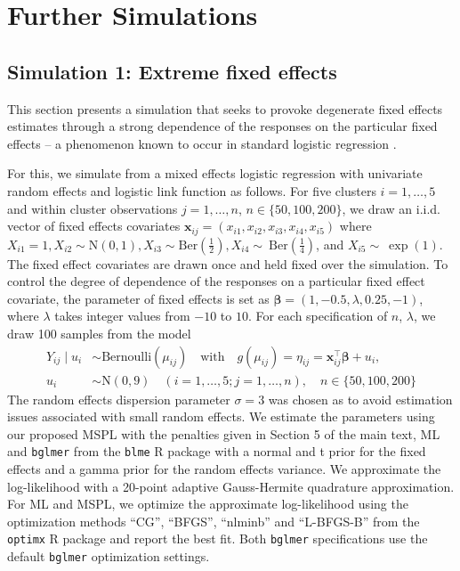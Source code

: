 \documentclass[11pt, a4paper]{article}
\newcommand*{\bb}{\boldsymbol}
\theoremstyle{example} \newtheorem{example}{Example}[section]
\theoremstyle{theorem} \newtheorem{theorem}{Theorem}[section]
\theoremstyle{theorem }\newtheorem{proposition}{Proposition}[section]
\theoremstyle{theorem }\newtheorem{corollary}{Corollary}[section]
\def\\bbeta{\bb{\\bbeta}}
\def\bx{\bb{x}}
\begin{document}
\section{Further Simulations} \label{sec:simuls}

\subsection{Simulation 1: Extreme fixed effects}\label{sec:sim1}

This section presents a simulation that seeks to provoke degenerate fixed effects estimates through a strong dependence of the responses on the particular fixed effects -- a phenomenon known to occur in standard logistic regression \citep{albert+anderson:1984,kosmidis+firth:2021}.

For this, we simulate from a mixed effects logistic regression with univariate random effects and logistic link function as follows. For five clusters $i=1,\ldots,5$ and within cluster observations $j=1,\ldots,n$, $n \in \{50,100,200\}$, we draw an i.i.d. vector of fixed effects covariates $\bx_{ij} = (x_{i1},x_{i2},x_{i3},x_{i4},x_{i5})$ where $X_{i1}=1, {X}_{i2} \sim \text{N}(0,1), {X}_{i3}\sim \textrm{Ber}\left(\frac{1}{2}\right), {X}_{i4}\sim~\textrm{Ber}\left(\frac{1}{4}\right)$, and ${X}_{i5}\sim~\exp(1)$. The fixed effect covariates are drawn once and held fixed over the simulation. To control the degree of dependence of the responses on a particular fixed effect covariate, the parameter of fixed effects is set as $\bb \beta=(1,-0.5,\lambda,0.25,-1)$, where $\lambda$ takes integer values from $-10$ to $10$. For each specification of $n$, $\lambda$, we draw 100 samples from the model 
\begin{equation}
	\begin{aligned}
		\label{eq:sim1_model} 
		Y_{ij} \mid {u}_i & \sim \text{Bernoulli}(\mu_{ij}) \quad \text{with} \quad
		g(\mu_{ij}) = \eta_{ij} = \bx_{ij}^\top \bb \beta + u_i,\\
		u_i & \sim \text{N}(0, 9)  \quad (i = 1, \ldots, 5; j = 1, \ldots, n), \quad n\in \{50,100,200\}
	\end{aligned}
\end{equation}
The random effects dispersion parameter $\sigma = 3$ was chosen as to avoid estimation issues associated with small random effects. We estimate the parameters using our proposed MSPL with the penalties given in Section 5 of the main text, ML and \texttt{bglmer}  from the \texttt{blme} R \citep{R} package \citep{chung+etal:2013} with a normal and t prior for the fixed effects and a gamma prior for the random effects variance. We approximate the log-likelihood with a 20-point adaptive Gauss-Hermite quadrature approximation. For ML and MSPL, we optimize the approximate log-likelihood using the optimization methods ``CG'', ``BFGS'', ``nlminb'' and ``L-BFGS-B'' from the \texttt{optimx} R package \citep{nash:2014} and report the best fit. Both \texttt{bglmer} specifications use the default \texttt{bglmer} optimization settings. 
\end{document}
